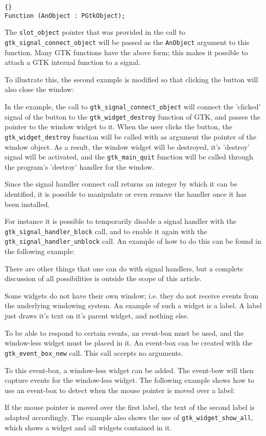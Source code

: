 \documentclass[10pt]{article}
\begin{document}
\begin{lstlisting}{}
Function (AnObject : PGtkObject);
\end{lstlisting}
The \lstinline|slot_object| pointer that was provided in the call to
\lstinline|gtk_signal_connect_object| will be passed as the
\lstinline|AnObject| argument to this function. Many GTK functions have the
above form; this makes it possible to attach a GTK internal function to a
signal.

To illustrate this, the second example is modified so that clicking the button
will also close the window:

In the example, the call to \lstinline|gtk_signal_connect_object| will
connect the 'clicked' signal of the button to the
\lstinline|gtk_widget_destroy| function of GTK, and passes the pointer to
the window widget to it. When the user clicks the button, the
\lstinline|gtk_widget_destroy| function will be called with as argument the
pointer of the window object. As a result, the window widget will be
destroyed, it's 'destroy' signal will be activated, and the
\lstinline|gtk_main_quit| function will be called through the program's
'destroy' handler for the window.

Since the signal handler connect call returns an integer by which it can 
be identified, it is possible to manipulate or even remove the handler 
once it has been installed.

For instance it is possible to temporarily disable a signal handler with the 
\lstinline|gtk_signal_handler_block| call, and to enable it again with the
\lstinline|gtk_signal_handler_unblock| call. An example of how to do this
can be found in the following example:

There are other things that one can do with signal handlers, but a complete
discussion of all possibilities is outside the scope of this article.

Some widgets do not have their own window; i.e. they do not receive events
from the underlying windowing system. An example of such a widget is a
label. A label just draws it's text on it's parent widget, and nothing else.

To be able to respond to certain events, an event-box must be used, and the 
window-less widget must be placed in it. An event-box can be created with
the \lstinline|gtk_event_box_new| call. This call accepts no arguments.

To this event-box, a window-less widget can be added. The event-bow will
then capture events for the window-less widget. The following example shows
how to use an event-box to detect when the mouse pointer is moved over a
label:

If the mouse pointer is moved over the first label, the text of the second
label is adapted accordingly. The example also shows the use of
\lstinline|gtk_widget_show_all|, which shows a widget and all widgets
contained in it.
\end{document}
